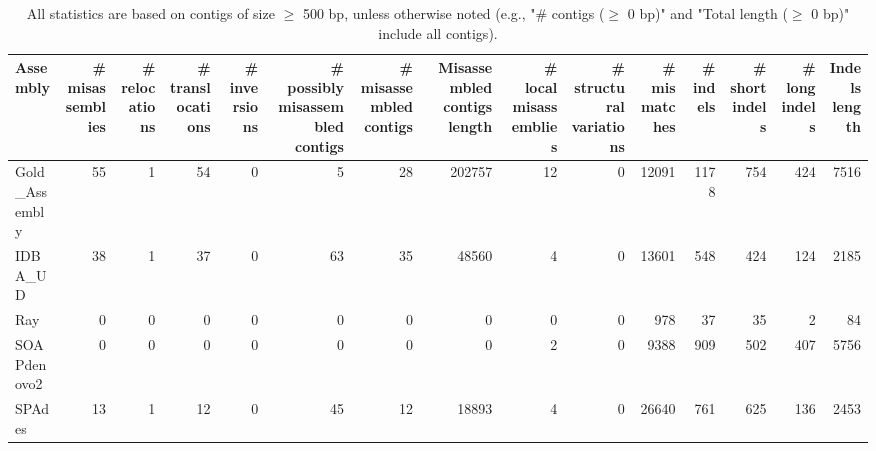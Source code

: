 \documentclass[12pt,a4paper]{article}
\begin{document}
\begin{table}[ht]
\begin{center}
\caption{All statistics are based on contigs of size $\geq$ 500 bp, unless otherwise noted (e.g., "\# contigs ($\geq$ 0 bp)" and "Total length ($\geq$ 0 bp)" include all contigs).}
\begin{tabular}{|l*{14}{|r}|}
\hline
Assembly & \# misassemblies &     \# relocations &     \# translocations &     \# inversions & \# possibly misassembled contigs & \# misassembled contigs & Misassembled contigs length & \# local misassemblies & \# structural variations & \# mismatches & \# indels &     \# short indels &     \# long indels & Indels length \\ \hline
Gold\_Assembly & 55 & 1 & 54 & 0 & 5 & 28 & 202757 & 12 & 0 & 12091 & 1178 & 754 & 424 & 7516 \\ \hline
IDBA\_UD & 38 & 1 & 37 & 0 & 63 & 35 & 48560 & 4 & 0 & 13601 & 548 & 424 & 124 & 2185 \\ \hline
Ray & 0 & 0 & 0 & 0 & 0 & 0 & 0 & 0 & 0 & 978 & 37 & 35 & 2 & 84 \\ \hline
SOAPdenovo2 & 0 & 0 & 0 & 0 & 0 & 0 & 0 & 2 & 0 & 9388 & 909 & 502 & 407 & 5756 \\ \hline
SPAdes & 13 & 1 & 12 & 0 & 45 & 12 & 18893 & 4 & 0 & 26640 & 761 & 625 & 136 & 2453 \\ \hline
\end{tabular}
\end{center}
\end{table}
\end{document}
